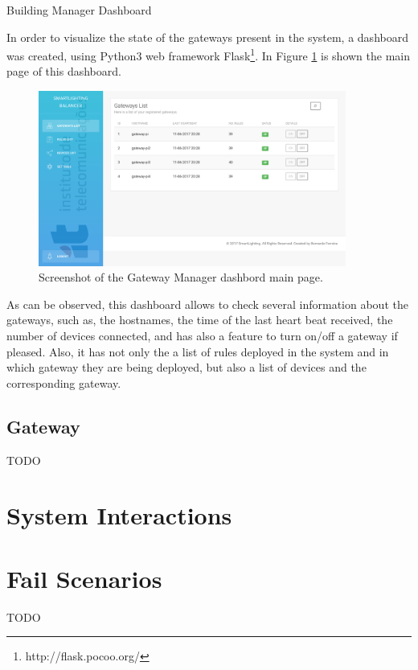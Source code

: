 \begin{Paragraph}{Building Manager Dashboard}

In order to visualize the state of the gateways present in the system, a dashboard was created, using Python3 web framework Flask\footnote{http://flask.pocoo.org/}. In Figure \ref{fig:main_gm} is shown the main page of this dashboard.

\begin{figure}[H]
	\centering
	\includegraphics[width=0.9\textwidth]{figures/main_gm.png}
	\caption{Screenshot of the Gateway Manager dashbord main page.}
	\label{fig:main_gm}
\end{figure}

As can be observed, this dashboard allows to check several information about the gateways, such as, the hostnames, the time of the last heart beat received, the number of devices connected, and has also a feature to turn on/off a gateway if pleased. Also, it has not only the a list of rules deployed in the system and in which gateway they are being deployed, but also a list of devices and the corresponding gateway.


\end{Paragraph}

\subsection{Gateway}
\label{arch:gw}
TODO

\section{System Interactions}
\label{implementation:interactions}

\section{Fail Scenarios}
\label{implementation:scenarios}
TODO


